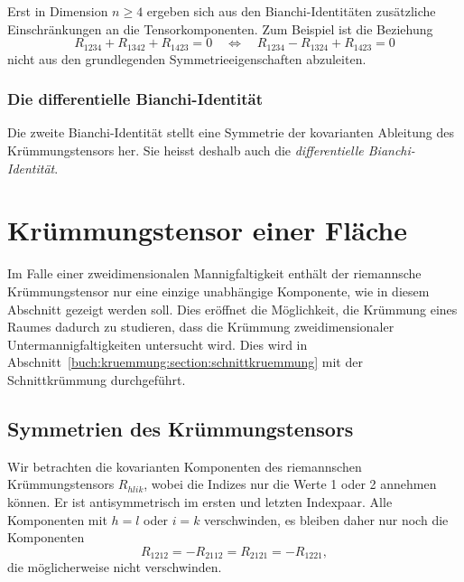 Erst in Dimension $n\ge 4$ ergeben sich aus den Bianchi-Identitäten
zusätzliche Einschränkungen an die Tensorkomponenten.
Zum Beispiel ist die Beziehung
\[
R_{1234}
+
R_{1342}
+
R_{1423}
=
0
\quad\Leftrightarrow\quad
R_{1234}
-
R_{1324}
+
R_{1423}
=
0
\]
nicht aus den grundlegenden Symmetrieeigenschaften abzuleiten.

%
%
\subsubsection{Die differentielle Bianchi-Identität}
Die zweite Bianchi-Identität stellt eine Symmetrie der kovarianten Ableitung
des Krümmungstensors her.
%
%
Sie heisst deshalb auch die \emph{differentielle Bianchi-Identität}.
%
%


%
%
\section{Krümmungstensor einer Fläche
\label{buch:kruemmung:section:flaeche}}
Im Falle einer zweidimensionalen Mannigfaltigkeit enthält der
riemannsche Krümmungstensor nur eine einzige unabhängige Komponente,
wie in diesem Abschnitt gezeigt werden soll.
Dies eröffnet die Möglichkeit, die Krümmung eines Raumes dadurch zu
studieren, dass die Krümmung zweidimensionaler Untermannigfaltigkeiten
untersucht wird.
Dies wird in Abschnitt~\ref{buch:kruemmung:section:schnittkruemmung}
mit der Schnittkrümmung durchgeführt.

%
%
\subsection{Symmetrien des Krümmungstensors}
Wir betrachten die kovarianten Komponenten des riemannschen
Krümmungstensors $R_{hlik}$, wobei die Indizes nur die Werte 1 oder 2
annehmen können.
Er ist antisymmetrisch im ersten und letzten Indexpaar.
Alle Komponenten mit $h=l$ oder $i=k$ verschwinden, es bleiben daher
nur noch die Komponenten
\[
R_{1212}
=
-R_{2112}
=
R_{2121}
=
-R_{1221},
\]
die möglicherweise nicht verschwinden.

